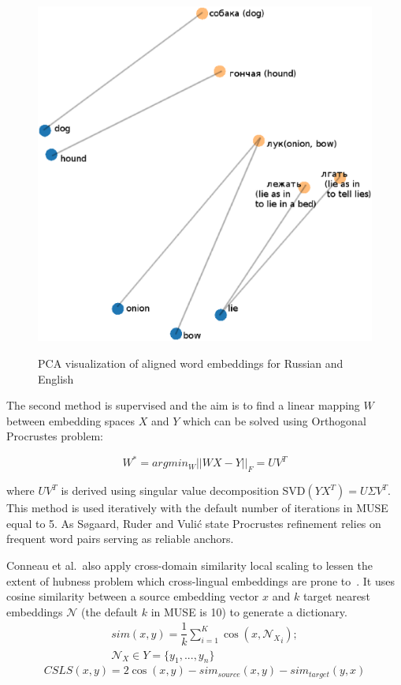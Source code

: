 \documentclass[11pt,a4paper]{article}
\begin{document}
\begin{figure}
	
	\centering
	\small
	\includegraphics[scale=0.3]{wordvectors}\\
	
	\caption{PCA visualization of aligned word embeddings for Russian and English}
	\label{wordvectors}
\end{figure}


The second method is supervised and the aim is to find a linear mapping $W$ between embedding spaces $X$ and $Y$ which can be solved using Orthogonal Procrustes problem:

$$ W^* = argmin_W ||WX - Y||_F = UV^T$$

where $UV^T$ is derived using singular value decomposition SVD$(YX^T) = U \Sigma V^T$.
This method is used iteratively with the default number of iterations in MUSE equal to 5. As Søgaard, Ruder and Vulić state Procrustes refinement relies on frequent word pairs serving as reliable anchors.

Conneau et al.\ also apply cross-domain similarity local scaling to lessen the extent of hubness problem which cross-lingual embeddings are prone to~\cite{dinu}. It uses cosine similarity between a source embedding vector $x$ and $k$ target nearest embeddings $\mathcal{N}$ (the default $k$ in MUSE is 10) to generate a dictionary.
\begin{align*}
sim(x, y) = \dfrac{1}{k}\sum_{i=1}^K\cos(x, {\mathcal{N}_X}_i);\\
\mathcal{N}_X \in Y=\{y_1,...,y_n\} 
\end{align*}
\small
$$CSLS(x,y) = 2\cos(x,y) - sim_{source}(x, y)  - sim_{target}(y, x)$$
\normalsize
\end{document}

